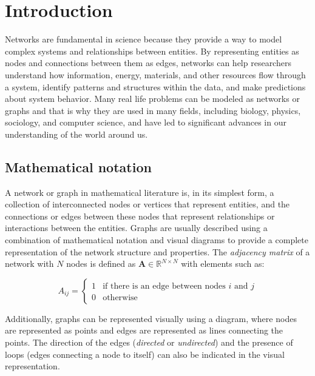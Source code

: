 
\chapter[Introduction]{Introduction}
\label{chap:intro}

Networks are fundamental in science because they provide a way to model complex systems and relationships between entities. By representing entities as nodes and connections between them as edges, networks can help researchers understand how information, energy, materials, and other resources flow through a system, identify patterns and structures within the data, and make predictions about system behavior. Many real life problems can be modeled as networks or graphs and that is why they are used in many fields, including biology, physics, sociology, and computer science, and have led to significant advances in our understanding of the world around us.

\section{Mathematical notation}
\label{sec:graph}
A network or graph in mathematical literature is, in its simplest form, a collection of interconnected nodes or vertices that represent entities, and the connections or edges between these nodes that represent relationships or interactions between the entities. Graphs are usually described using a combination of mathematical notation and visual diagrams to provide a complete representation of the network structure and properties. The \emph{adjacency matrix} of a network with $N$ nodes is defined as $\mathbf{A}\in\mathbb{R}^{N\times N}$ with elements such as:

\begin{equation}
  A_{ij} =
    \begin{cases}
      1 & \text{if there is an edge between nodes $i$ and $j$}\\
      0 & \text{otherwise}
    \end{cases}       
\end{equation}

Additionally, graphs can be represented visually using a diagram, where nodes are represented as points and edges are represented as lines connecting the points. The direction of the edges (\textit{directed} or \textit{undirected}) and the presence of loops (edges connecting a node to itself) can also be indicated in the visual representation.


